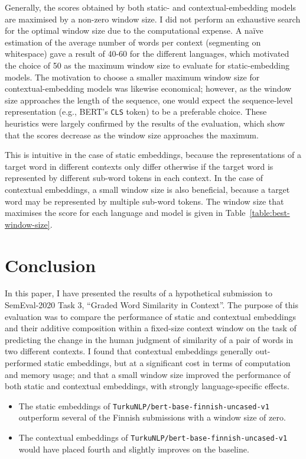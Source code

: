 Generally, the scores obtained by both static- and contextual-embedding models are
maximised by a non-zero window size.
I did not perform an exhaustive search for the optimal window size due to the
computational expense.
A naïve estimation of the average number of words per context (segmenting on whitespace)
gave a result of 40-60 for the different languages, which motivated the choice of 50 as
the maximum window size to evaluate for static-embedding models.
The motivation to choose a smaller maximum window size for contextual-embedding models
was likewise economical; however, as the window size approaches the length of the
sequence, one would expect the sequence-level representation (e.g., BERT's \texttt{CLS}
token) to be a preferable choice.
These heuristics were largely confirmed by the results of the evaluation, which show
that the scores decrease as the window size approaches the maximum.

This is intuitive in the case of static embeddings, because the representations of a
target word in different contexts only differ otherwise if the target word is
represented by different sub-word tokens in each context.
In the case of contextual embeddings, a small window size is also beneficial, because
a target word may be represented by multiple sub-word tokens.
The window size that maximises the score for each language and model is given in
Table~\ref{table:best-window-size}.

\section{Conclusion}

In this paper, I have presented the results of a hypothetical submission to SemEval-2020
Task 3, ``Graded Word Similarity in Context''.
The purpose of this evaluation was to compare the performance of static and contextual
embeddings and their additive composition within a fixed-size context window on the task
of predicting the change in the human judgment of similarity of a pair of words in two
different contexts.
I found that contextual embeddings generally out-performed static embeddings, but at a
significant cost in terms of computation and memory usage; and that a small window size
improved the performance of both static and contextual embeddings, with strongly
language-specific effects.

\begin{itemize}
  \item The static embeddings of \texttt{TurkuNLP/bert-base-finnish-uncased-v1}
        outperform several of the Finnish submissions with a window size of zero.
  \item The contextual embeddings of \texttt{TurkuNLP/bert-base-finnish-uncased-v1}
        would have placed fourth and slightly improves on the baseline.
\end{itemize}
